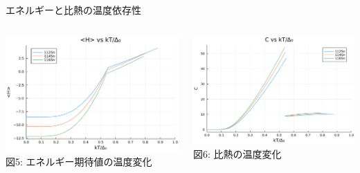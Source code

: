 \documentclass[aspectratio=169, 12pt, dvipdfmx]{beamer}
\begin{document}
\begin{frame}{エネルギーと比熱の温度依存性}
  \begin{columns}[totalwidth=1.0\linewidth]
    \begin{column}[T]{0.5\linewidth}
      \centering
      \includegraphics[width=\textwidth]{Comp_FT_H.pdf}
      \vspace{5pt} %
      \scriptsize 図5: エネルギー期待値の温度変化
    \end{column}

  \begin{column}[T]{0.5\linewidth}
    \centering
    \includegraphics[width=\textwidth]{Comp_FT_C.pdf}
    \vspace{5pt} %
    \scriptsize 図6: 比熱の温度変化
  \end{column}
  \end{columns}
\end{frame}
\end{document}
